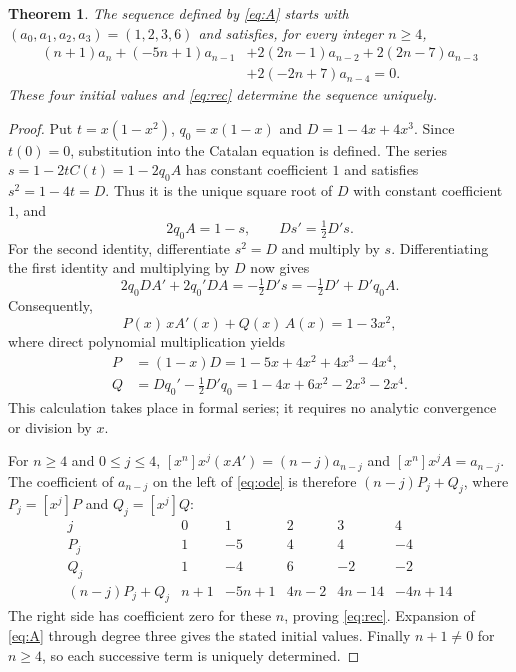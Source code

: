 \documentclass[11pt]{article}
\newtheorem{theorem}{Theorem}
\newcommand{\coeff}[1]{[x^{#1}]}
\begin{document}
\begin{theorem}\label{thm:main}
The sequence defined by \eqref{eq:A} starts with
$(a_0,a_1,a_2,a_3)=(1,2,3,6)$ and satisfies, for every integer $n\geq4$,
\begin{equation}\label{eq:rec}
\begin{split}
 (n+1)a_n+(-5n+1)a_{n-1}
 &+2(2n-1)a_{n-2}+2(2n-7)a_{n-3}\\
 &+2(-2n+7)a_{n-4}=0.
\end{split}
\end{equation}
These four initial values and \eqref{eq:rec} determine the sequence uniquely.
\end{theorem}

\begin{proof}
Put $t=x(1-x^2)$, $q_0=x(1-x)$ and $D=1-4x+4x^3$.
Since $t(0)=0$, substitution into the Catalan equation is defined.
The series $s=1-2tC(t)=1-2q_0A$ has constant coefficient $1$ and satisfies
$s^2=1-4t=D$. Thus it is the unique square root of $D$ with
constant coefficient $1$, and
\begin{equation}\label{eq:radical}
 2q_0A=1-s,\qquad D s'=\tfrac12D's.
\end{equation}
For the second identity, differentiate $s^2=D$ and multiply by $s$.
Differentiating the first identity and multiplying by $D$ now gives
\[
 2q_0D A'+2q_0'D A=-\tfrac12D's
                 =-\tfrac12D'+D'q_0A.
\]
Consequently,
\begin{equation}\label{eq:ode}
 P(x)\,xA'(x)+Q(x)\,A(x)=1-3x^2,
\end{equation}
where direct polynomial multiplication yields
\begin{align*}
 P&=(1-x)D=1-5x+4x^2+4x^3-4x^4,\\
 Q&=Dq_0'-\tfrac12D'q_0
       =1-4x+6x^2-2x^3-2x^4.
\end{align*}
This calculation takes place in formal series; it requires no analytic
convergence or division by $x$.

For $n\geq4$ and $0\leq j\leq4$,
$\coeff{n}x^j(xA')=(n-j)a_{n-j}$ and
$\coeff{n}x^jA=a_{n-j}$. The coefficient of $a_{n-j}$ on the left of
\eqref{eq:ode} is therefore $(n-j)P_j+Q_j$, where
$P_j=\coeff{j}P$ and $Q_j=\coeff{j}Q$:
\[
\begin{array}{c|rrrrr}
 j&0&1&2&3&4\\ \hline
 P_j&1&-5&4&4&-4\\
 Q_j&1&-4&6&-2&-2\\
 (n-j)P_j+Q_j&n+1&-5n+1&4n-2&4n-14&-4n+14
\end{array}
\]
The right side has coefficient zero for these $n$, proving
\eqref{eq:rec}. Expansion of \eqref{eq:A} through degree three gives
the stated initial values. Finally $n+1\ne0$ for $n\geq4$, so each
successive term is uniquely determined.
\end{proof}
\end{document}

